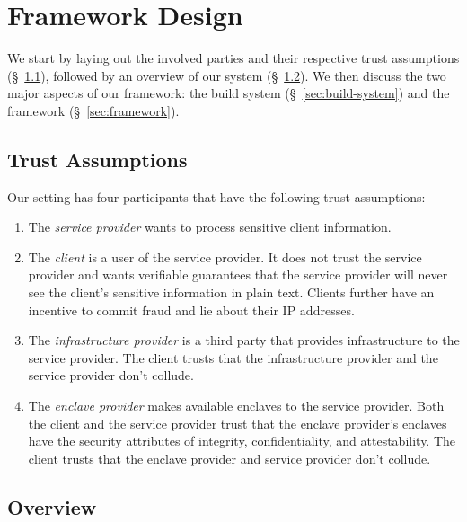 \section{Framework Design}
\label{sec:design}

We start by laying out the involved parties and their respective trust
assumptions (\S~\ref{sec:trust-assumptions}), followed by an overview of our
system (\S~\ref{sec:overview}).  We then discuss the two major aspects of our
framework: the build system (\S~\ref{sec:build-system}) and the framework
(\S~\ref{sec:framework}).

\subsection{Trust Assumptions}
\label{sec:trust-assumptions}

Our setting has four participants that have the following trust assumptions:

\begin{enumerate}
    \item The \emph{service provider} wants to process sensitive client
      information.

    \item The \emph{client} is a user of the service provider.  It does not
      trust the service provider and wants verifiable guarantees that the
      service provider will never see the client's sensitive information in
      plain text.  Clients further have an incentive to commit fraud and lie
      about their IP addresses.

    \item The \emph{infrastructure provider} is a third party that provides
      infrastructure to the service provider.  The client trusts that the
      infrastructure provider and the service provider don't collude.

    \item The \emph{enclave provider} makes available enclaves to the service
      provider.  Both the client and the service provider trust that the
      enclave provider's enclaves have the security attributes of integrity,
      confidentiality, and attestability.  The client trusts that the enclave
      provider and service provider don't collude.
\end{enumerate}

\subsection{Overview}
\label{sec:overview}

